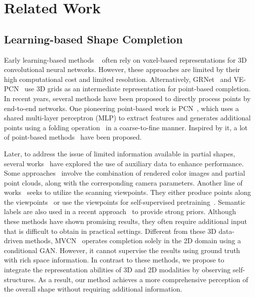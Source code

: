 \section{Related Work}
\subsection{Learning-based Shape Completion}
Early learning-based methods ~\citep{dai2017shape,han2017high,stutz2018learning,varley2017shape} often rely on voxel-based representations for 3D convolutional neural networks. However, these approaches are limited by their high computational cost and limited resolution. Alternatively, GRNet~\citep{xie2020grnet} and VE-PCN~\citep{wang2021voxel} use 3D grids as an intermediate representation for point-based completion.  
In recent years, several methods have been proposed to directly process points by end-to-end networks. One pioneering point-based work is PCN~\citep{yuan2018pcn}, which uses a shared multi-layer perceptron (MLP) to extract features and generates additional points using a folding operation~\citep{yang2018foldingnet} in a coarse-to-fine manner. Inspired by it, a lot of point-based methods~\citep{wang2020cascaded,liu2020morphing,wen2020point,9928787,zhou2022seedformer,yu2021pointr,SCRN,pan2020ecg,AGConv,scpnet,zhou2020geometry,chen2022repcd} have been proposed.

Later, to address the issue of limited information available in partial shapes, several works~\citep{zhang2021view,aiello2022crossmodal,zhu2023csdn,huang2022spovt,zhang2022shape,Gong_2021_ICCV,fu2023vapcnet} have explored the use of auxiliary data to enhance performance. 
Some approaches~\citep{zhang2021view,aiello2022crossmodal,zhu2023csdn} involve the combination of rendered color images and partial point clouds, along with the corresponding camera parameters.
Another line of works~\citep{zhang2022shape,Gong_2021_ICCV,fu2023vapcnet} seeks to utilize the scanning viewpoints. They either produce points along the viewpoints~\citep{Gong_2021_ICCV,zhang2022shape} or use the viewpoints for self-supervised pretraining~\citep{fu2023vapcnet}.
Semantic labels are also used in a recent approach~\citep{huang2022spovt} to provide strong priors.
Although these methods have shown promising results, they often require additional input that is difficult to obtain in practical settings. 
Different from these 3D data-driven methods, MVCN~\citep{hu2019render4completion} operates completion solely in the 2D domain using a conditional GAN. However, it cannot supervise the results using ground truth with rich space information. 
In contrast to these methods, we propose to integrate the representation abilities of 3D and 2D modalities by observing self-structures. As a result, our method achieves a more comprehensive perception of the overall shape without requiring additional information.

